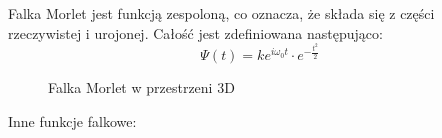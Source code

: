 Falka Morlet jest funkcją zespoloną, co oznacza, że składa się z części rzeczywistej i urojonej. Całość jest zdefiniowana następująco:
\begin{equation*}
    \Psi(t)=k e^{i \omega_0 t} \cdot e^{-\frac{t^2}{2}}
\end{equation*}

\begin{figure}[ht]
    \centering
    \caption{Falka Morlet w przestrzeni 3D}
    \label{fig:image30}
\end{figure}

Inne funkcje falkowe:

